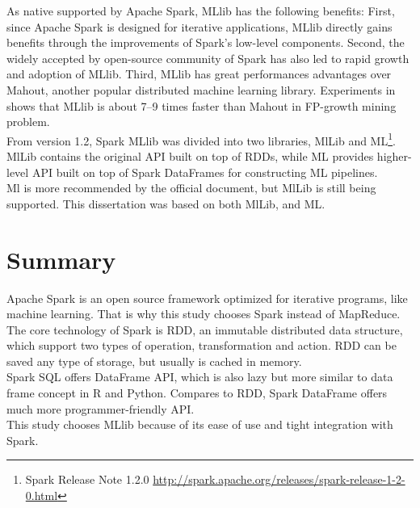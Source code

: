 As native supported by Apache Spark, MLlib has the following benefits\cite{meng2016mllib}: First, since Apache Spark is designed for iterative applications, MLlib directly gains benefits through the improvements of Spark's low-level components. Second, the widely accepted by open-source community of Spark has also led to rapid growth and adoption of MLlib. Third, MLlib has great performances advantages over Mahout, another popular distributed machine learning library. Experiments in \cite{1_li_jiang_zhang_boesch_xiao_2015} shows that MLlib is about 7--9 times faster than Mahout in FP-growth mining problem.\\


From version 1.2, Spark MLlib was divided into two libraries, MlLib and ML\footnote{Spark Release Note 1.2.0 \url{http://spark.apache.org/releases/spark-release-1-2-0.html}}. MlLib contains the original API built on top of RDDs, while ML provides higher-level API built on top of Spark DataFrames for constructing ML pipelines.\\


Ml is more recommended by the official document, but MlLib is still being supported. This dissertation was based on both MlLib, and ML.


\section{Summary}
Apache Spark is an open source framework optimized for iterative programs, like machine learning. That is why this study chooses Spark instead of MapReduce.\\


The core technology of Spark is RDD, an immutable distributed data structure, which support two types of operation, transformation and action. RDD can be saved any type of storage, but usually is cached in memory.\\


Spark SQL offers DataFrame API, which is also lazy but more similar to data frame concept in R and Python. Compares to RDD, Spark DataFrame offers much more programmer-friendly API.\\


This study chooses MLlib because of its ease of use and tight integration with Spark.



